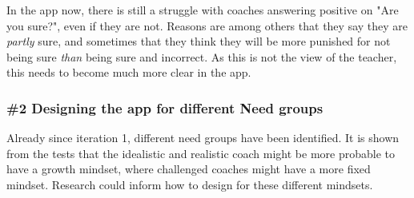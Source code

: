 In the app now, there is still a struggle with coaches answering positive on "Are you sure?", even if they are not. Reasons are among others that they say they are \textit{partly} sure, and sometimes that they think they will be more punished for not being sure \textit{than} being sure and incorrect. As this is not the view of the teacher, this needs to become much more clear in the app.

\subsubsection{\#2 Designing the app for different Need groups}
Already since iteration 1, different need groups have been identified. It is shown from the tests that the idealistic and realistic coach might be more probable to have a growth mindset, where challenged coaches might have a more fixed mindset. Research could inform how to design for these different mindsets.
